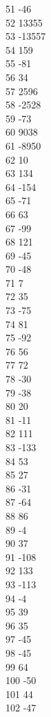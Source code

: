 { 51	-46 \\
 52	13355 \\
 53	-13557 \\
 54	159 \\
 55	-81 \\
 56	34 \\
 57	2596 \\
 58	-2528 \\
 59	-73 \\
 60	9038 \\
 61	-8950 \\
 62	10 \\
 63	134 \\
 64	-154 \\
 65	-71 \\
 66	63 \\
 67	-99 \\
 68	121 \\
 69	-45 \\
 70	-48 \\
 71	7 \\
 72	35 \\
 73	-75 \\
 74	81 \\
 75	-92 \\
 76	56 \\
 77	72 \\
 78	-30 \\
 79	-38 \\
 80	20 \\
 81	-11 \\
 82	111 \\
 83	-133 \\
 84	53 \\
 85	27 \\
 86	-31 \\
 87	-64 \\
 88	86 \\
 89	-4 \\
 90	37 \\
 91	-108 \\
 92	133 \\
 93	-113 \\
 94	-4 \\
 95	39 \\
 96	35 \\
 97	-45 \\
 98	-45 \\
 99	64 \\
 100	-50 \\
 101	44 \\
 102	-47 \\
}
